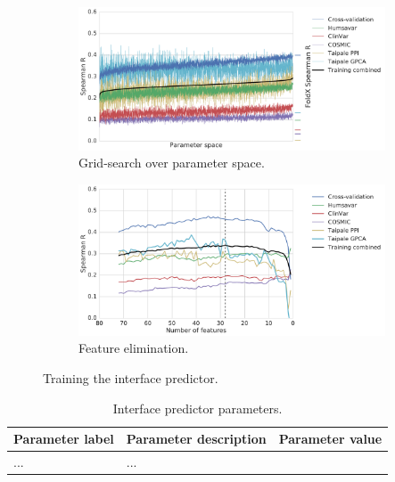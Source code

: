 \begin{figure}[ht]
	\centering

	\begin{subfigure}[b]{1.0\textwidth}
		\centering
		\includegraphics[width=0.6\linewidth]{static/elaspic_training_set/machine_learning/gridsearch_interface.pdf}
		\caption{Grid-search over parameter space.}
		\label{fig:gridsearch_interface}
	\end{subfigure}

	\begin{subfigure}[b]{1\textwidth}
		\centering
		\includegraphics[width=0.75\linewidth]{static/elaspic_training_set/machine_learning/feature_elimination_interface.pdf}
		\caption{Feature elimination.}
		\label{fig:feature_elimination_interface}
	\end{subfigure}

	\caption[Interface predictor training.]{Training the interface predictor.}
\end{figure}



\begin{table}[ht]
\caption{Interface predictor parameters.} \label{tab:interface_parameters}
\begin{tabular}{l | l | l}
	\toprule
	Parameter label & Parameter description & Parameter value \\
	\midrule
	... & ... \\
	\bottomrule
\end{tabular}
\end{table}


